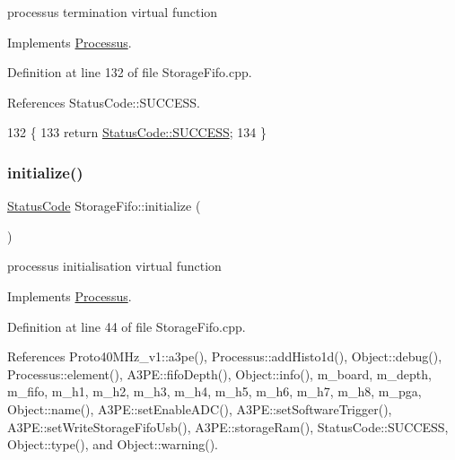 processus termination virtual function 

Implements \hyperlink{classProcessus_aba93d691f031bdb18ae4b8afb1b2e856}{Processus}.



Definition at line 132 of file Storage\+Fifo.\+cpp.



References Status\+Code\+::\+S\+U\+C\+C\+E\+SS.


\begin{DoxyCode}
132                                    \{
133   \textcolor{keywordflow}{return} \hyperlink{classStatusCode_a6f565cbeadc76d14c72f047e5e85eb4badd0da38d3ba0d922efd1f4619bc37ad8}{StatusCode::SUCCESS};
134 \}
\end{DoxyCode}
\mbox{\label{classStorageFifo_a568becd5cb8d0cb5307a39e0d27fb332}} 
\subsubsection{\texorpdfstring{initialize()}{initialize()}}
{\footnotesize\ttfamily \hyperlink{classStatusCode}{Status\+Code} Storage\+Fifo\+::initialize (\begin{DoxyParamCaption}{ }\end{DoxyParamCaption})\hspace{0.3cm}{\ttfamily [virtual]}}

processus initialisation virtual function 

Implements \hyperlink{classProcessus_aee88ad7b77ae7319cf8b128e9dd2ea11}{Processus}.



Definition at line 44 of file Storage\+Fifo.\+cpp.



References Proto40\+M\+Hz\+\_\+v1\+::a3pe(), Processus\+::add\+Histo1d(), Object\+::debug(), Processus\+::element(), A3\+P\+E\+::fifo\+Depth(), Object\+::info(), m\+\_\+board, m\+\_\+depth, m\+\_\+fifo, m\+\_\+h1, m\+\_\+h2, m\+\_\+h3, m\+\_\+h4, m\+\_\+h5, m\+\_\+h6, m\+\_\+h7, m\+\_\+h8, m\+\_\+pga, Object\+::name(), A3\+P\+E\+::set\+Enable\+A\+D\+C(), A3\+P\+E\+::set\+Software\+Trigger(), A3\+P\+E\+::set\+Write\+Storage\+Fifo\+Usb(), A3\+P\+E\+::storage\+Ram(), Status\+Code\+::\+S\+U\+C\+C\+E\+SS, Object\+::type(), and Object\+::warning().



